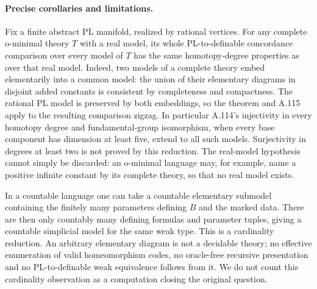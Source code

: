 \paragraph{Precise corollaries and limitations.}
Fix a finite abstract PL manifold, realized by rational vertices.
For any complete o-minimal theory $T$ with a real model, its whole
PL-to-definable concordance comparison over every model of $T$ has
the same homotopy-degree properties as over that real model. Indeed,
two models of a complete theory embed elementarily into a common
model: the union of their elementary diagrams in disjoint added
constants is consistent by completeness and compactness. The
rational PL model is preserved by both embeddings, so the theorem
and A.115 apply to the resulting comparison zigzag. In particular A.114's
injectivity in every homotopy degree and fundamental-group
isomorphism, when every base component has dimension at least five,
extend to all such models. Surjectivity in degrees at least two is
not proved by this reduction. The real-model
hypothesis cannot simply be discarded: an o-minimal language may,
for example, name a positive infinite constant by its complete
theory, so that no real model exists.

In a countable language one can take a countable elementary submodel
containing the finitely many parameters defining $B$ and the marked
data. There are then only countably many defining formulas and
parameter tuples, giving a countable simplicial model for the same
weak type. This is a cardinality reduction. An arbitrary elementary
diagram is not a decidable theory; no effective enumeration of valid
homeomorphism codes, no oracle-free recursive presentation and no
PL-to-definable weak equivalence follows from it. We do not count
this cardinality observation as a computation closing the original
question.
